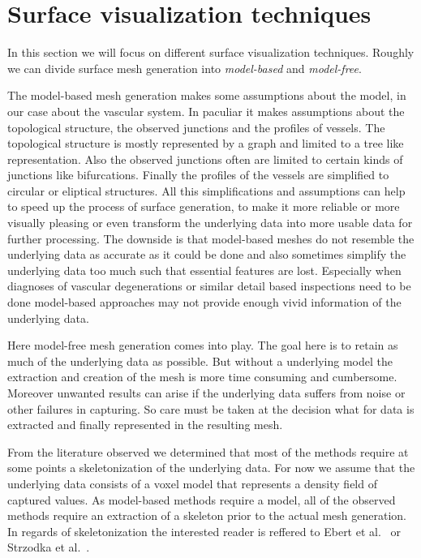 

\section{Surface visualization techniques}

In this section we will focus on different surface visualization techniques. Roughly we can divide surface mesh generation into \emph{model-based} and \emph{model-free}.

The model-based mesh generation makes some assumptions about the model, in our case about the vascular system.
In paculiar it makes assumptions about the topological structure, the observed junctions and the profiles of vessels. The topological structure is mostly represented by a graph and limited to a tree like representation. Also the observed junctions often are limited to certain kinds of junctions like bifurcations. Finally the profiles of the vessels are simplified to circular or eliptical structures.
All this simplifications and assumptions can help to speed up the process of surface generation, to make it more reliable or more visually pleasing or even transform the underlying data into more usable data for further processing. The downside is that model-based meshes do not resemble the underlying data as accurate as it could be done and also sometimes simplify the underlying data too much such that essential features are lost.
Especially when diagnoses of vascular degenerations or similar detail based inspections need to be done model-based approaches may not provide enough vivid information of the underlying data.

Here model-free mesh generation comes into play. The goal here is to retain as much of the underlying data as possible. But without a underlying model the extraction and creation of the mesh is more time consuming and cumbersome. Moreover unwanted results can arise if the underlying data suffers from noise or other failures in capturing. So care must be taken at the decision what for data is extracted and finally represented in the resulting mesh.

From the literature observed we determined that most of the methods require at some points a skeletonization of the underlying data. For now we assume that the underlying data consists of a voxel model that represents a density field of captured values. As model-based methods require a model, all of the observed methods require an extraction of a skeleton prior to the actual mesh generation. In regards of skeletonization the interested reader is reffered to Ebert et al.~\cite{ebert2002augmented} or  Strzodka et al.~\cite{strzodka2004generalized}.


